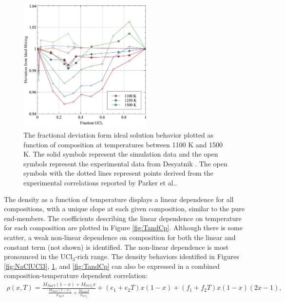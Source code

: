\documentclass[preprint,3p,10pt,onecolumn,number,sort&compress]{elsarticle}
\begin{document}
{\begin{figure}[htb]
\centering
\includegraphics[width=0.6\textwidth]{fig7.jpg}
\caption{The fractional deviation form ideal solution behavior plotted as function of composition at temperatures between 1100 K and 1500 K. The solid symbols represent the simulation data and the open symbols represent the experimental data from Desyatnik \cite{Desyatnik}. The open symbols with the dotted lines represent points derived from the experimental correlations reported by Parker et al.\cite{Parker}.} 
\label{fig:ideal}
\end{figure}

The density as a function of temperature displays a linear dependence for all compositions, with a unique slope at each given composition, similar to the pure end-members. The coefficients describing the linear dependence on temperature for each composition are plotted in Figure \ref{fig:TandCp}. Although there is some scatter, a weak non-linear dependence on composition for both the linear and constant term (not shown) is identified. The non-linear dependence is most pronounced in the UCl$_3$-rich range. The density behaviors identified in Figures \ref{fig:NaClUCl3}, \ref{fig:ideal}, and \ref{fig:TandCp} can also be expressed in a combined composition-temperature dependent correlation:
\begin{equation}
\begin{split}
\rho(x,T)=\frac{M_{NaCl}(1-x)+M_{UCl_3}x}{\frac{M_{NaCl}(1-x)}{\rho_{NaCl}}+\frac{M_{UCl3}x}{\rho_{UCl_3}}}+(e_1+e_2T)x(1-x)+(f_1+f_2T)x(1-x)(2x-1), 
\label{eq:LS}
\end{split}
\end{equation}

}
\end{document}
